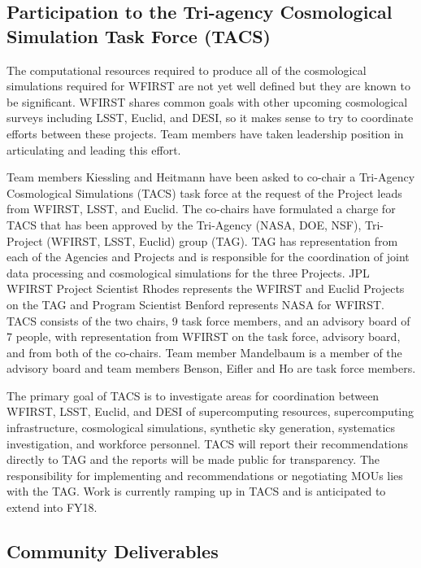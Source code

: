 \subsection{Participation to the Tri-agency  Cosmological Simulation Task Force (TACS)}
\label{sec:tacs}
The computational resources required to produce all of the cosmological simulations required for WFIRST are not yet well defined but they are known to be significant. WFIRST shares common goals with other upcoming cosmological surveys including LSST, Euclid, and DESI, so it makes sense to try to coordinate efforts between these projects. Team members have taken leadership position in articulating and leading this effort.

Team members Kiessling and Heitmann have been asked to co-chair a Tri-Agency Cosmological Simulations (TACS) task force at the request of the Project leads from WFIRST, LSST, and Euclid. The co-chairs have formulated a charge for TACS that has been approved by the Tri-Agency (NASA, DOE, NSF), Tri-Project (WFIRST, LSST, Euclid) group (TAG). TAG has representation from each of the Agencies and Projects and is responsible for the coordination of joint data processing and cosmological simulations for the three Projects. JPL WFIRST Project Scientist Rhodes represents the WFIRST and Euclid Projects on the TAG and Program Scientist Benford represents NASA for WFIRST. TACS consists of the two chairs, 9 task force members, and an advisory board of 7 people, with representation from WFIRST on the task force, advisory board, and from both of the co-chairs. Team member Mandelbaum is a member of the advisory board and team members Benson, Eifler and Ho are task force members.

The primary goal of TACS is to investigate areas for coordination between WFIRST, LSST, Euclid, and DESI of supercomputing resources, supercomputing infrastructure, cosmological simulations, synthetic sky generation, systematics investigation, and workforce personnel. TACS will report their recommendations directly to TAG and the reports will be made public for transparency. The responsibility for implementing and recommendations or negotiating MOUs lies with the TAG. Work is currently ramping up in TACS and is anticipated to extend into FY18.

\subsection{Community Deliverables}

